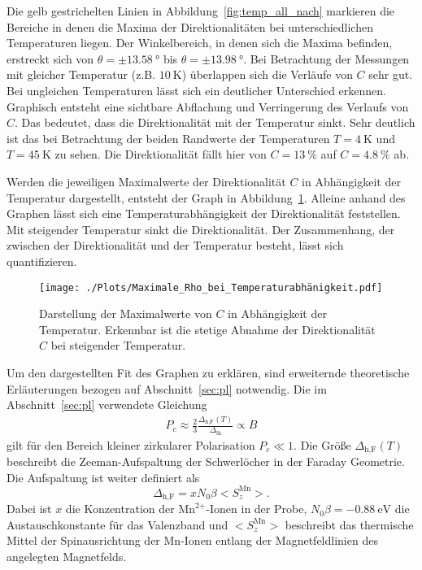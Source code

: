 Die gelb gestrichelten Linien in Abbildung~\ref{fig:temp_all_nach} markieren die Bereiche 
in denen die Maxima der Direktionalitäten
bei unterschiedlichen Temperaturen liegen.
Der Winkelbereich, in denen sich die Maxima befinden, erstreckt sich von  $\theta = \pm \SI{13,58}{\degree} 
$ bis $ \theta = \pm \SI{13,98}{\degree}$.
Bei Betrachtung der Messungen mit gleicher Temperatur (z.B. $\SI{10}{\kelvin}$) 
überlappen sich die Verläufe von $C$ sehr gut.
Bei ungleichen Temperaturen lässt sich ein deutlicher Unterschied erkennen.
Graphisch entsteht eine sichtbare Abflachung und Verringerung des Verlaufs von $C$.
Das bedeutet, dass die Direktionalität mit der Temperatur sinkt.
Sehr deutlich ist das bei Betrachtung der beiden Randwerte 
der Temperaturen $T = \SI{4}{\kelvin}$ und $ T = \SI{45}{\kelvin}$ zu sehen.
Die Direktionalität fällt hier von $C= \SI{13}{\percent}$ auf $C = \SI{4,8}{\percent}$ ab.

Werden die jeweiligen Maximalwerte der Direktionalität $C$ in Abhängigkeit
der Temperatur dargestellt, entsteht der Graph in Abbildung~\ref{fig:fit}.
Alleine anhand des Graphen lässt sich eine Temperaturabhängigkeit der Direktionalität
feststellen.
Mit steigender Temperatur sinkt die Direktionalität.
Der Zusammenhang, der zwischen der Direktionalität und der Temperatur besteht, lässt sich 
quantifizieren.
\newpage %
\begin{figure}
    \centering
    \texttt{[image: ./Plots/Maximale\_Rho\_bei\_Temperaturabhänigkeit.pdf]}
    \caption{Darstellung der Maximalwerte von $C$ in Abhängigkeit der Temperatur.
    Erkennbar ist die stetige Abnahme der Direktionalität $C$ bei steigender Temperatur.}
    \label{fig:fit}
\end{figure}
\FloatBarrier

Um den dargestellten Fit des Graphen zu erklären,
sind erweiternde theoretische Erläuterungen bezogen auf Abschnitt~\ref{sec:pl} notwendig.
Die im Abschnitt~\ref{sec:pl} verwendete Gleichung 
\begin{align*}
    P_c \approx \frac{2}{3} \frac{\Delta_\text{h,F}(T)}{\Delta_\text{lh}} \propto B
\end{align*}
gilt für den Bereich kleiner zirkularer Polarisation $P_{c}\ll 1$. 
Die Größe $\Delta_\text{h,F}(T)$ beschreibt die 
Zeeman-Aufspaltung der Schwerlöcher in der Faraday Geometrie.
Die Aufspaltung ist weiter definiert als~\cite{nature} 
\begin{equation}
    \Delta_\text{h,F} = xN_0\beta \bigl< S^\text{Mn}_{z} \bigr>.
\end{equation}
Dabei ist $x$ die Konzentration der $\text{Mn}^\text{2+}\text{-Ionen}$ in der Probe,
$N_0\beta = -\SI{0.88}{\eV}$ die Austauschkonstante für das Valenzband und 
$\bigl< S^\text{Mn}_{z} \bigr>$ beschreibt das thermische Mittel der Spinausrichtung
der Mn-Ionen entlang der Magnetfeldlinien des angelegten Magnetfelds.


